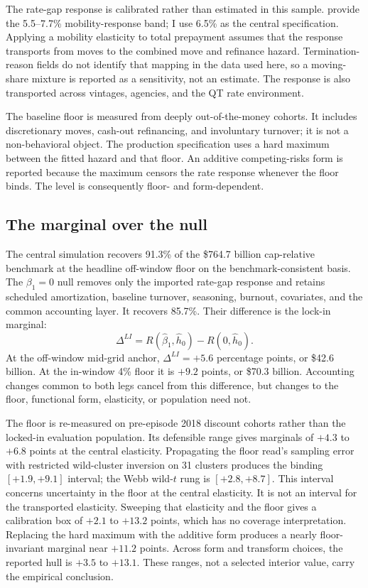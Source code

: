\documentclass[12pt]{article}
\begin{document}
The rate-gap response is calibrated rather than estimated in this sample.
\citet{liebersohn2024} provide the 5.5--7.7\% mobility-response band; I use
6.5\% as the central specification. Applying a mobility elasticity to total
prepayment assumes that the response transports from moves to the combined move
and refinance hazard. Termination-reason fields do not identify that mapping in
the data used here, so a moving-share mixture is reported as a sensitivity, not
an estimate. The response is also transported across vintages, agencies, and
the QT rate environment.

The baseline floor is measured from deeply out-of-the-money cohorts. It includes
discretionary moves, cash-out refinancing, and involuntary turnover; it is not a
non-behavioral object. The production specification uses a hard maximum between
the fitted hazard and that floor. An additive competing-risks form is reported
because the maximum censors the rate response whenever the floor binds. The
level is consequently floor- and form-dependent.

\subsection{The marginal over the null}\label{sec:identification}

The central simulation recovers 91.3\% of the \$764.7 billion cap-relative
benchmark at the headline off-window floor on the benchmark-consistent basis.
The $\beta_1=0$ null removes only the imported rate-gap response and retains
scheduled amortization, baseline turnover, seasoning, burnout, covariates, and
the common accounting layer. It recovers 85.7\%. Their difference is the
lock-in marginal:
\begin{equation}\label{eq:marginal}
\Delta^{LI}=R(\widehat\beta_1,\widehat h_0)-R(0,\widehat h_0).
\end{equation}
At the off-window mid-grid anchor, $\Delta^{LI}=+5.6$ percentage points, or
\$42.6 billion. At the in-window 4\% floor it is $+9.2$ points, or \$70.3
billion. Accounting changes common to both legs cancel from this difference,
but changes to the floor, functional form, elasticity, or population need not.

The floor is re-measured on pre-episode 2018 discount cohorts rather than the
locked-in evaluation population. Its defensible range gives marginals of
$+4.3$ to $+6.8$ points at the central elasticity. Propagating the floor read's
sampling error with restricted wild-cluster inversion on 31 clusters produces
the binding $[+1.9,+9.1]$ interval; the Webb wild-$t$ rung is
$[+2.8,+8.7]$. This interval concerns uncertainty in the floor at the central
elasticity. It is not an interval for the transported elasticity. Sweeping that
elasticity and the floor gives a calibration box of $+2.1$ to $+13.2$ points,
which has no coverage interpretation. Replacing the hard maximum with the
additive form produces a nearly floor-invariant marginal near $+11.2$ points.
Across form and transform choices, the reported hull is $+3.5$ to $+13.1$.
These ranges, not a selected interior value, carry the empirical conclusion.
\end{document}
